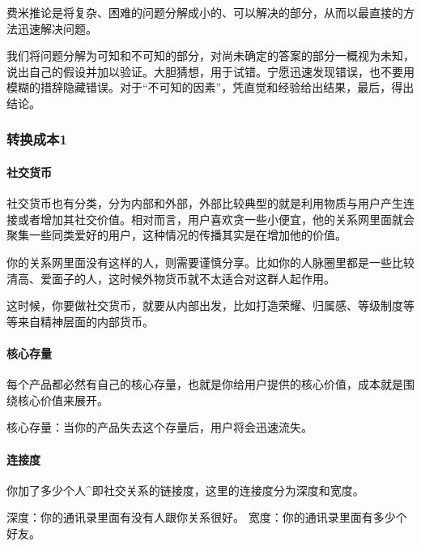 \documentclass[letterpaper,10pt,english]{sphinxmanual}
\begin{document}
费米推论是将复杂、困难的问题分解成小的、可以解决的部分，从而以最直接的方法迅速解决问题。

我们将问题分解为可知和不可知的部分，对尚未确定的答案的部分一概视为未知，说出自己的假设并加以验证。大胆猜想，用于试错。宁愿迅速发现错误，也不要用模糊的措辞隐藏错误。对于“不可知的因素”，凭直觉和经验给出结果，最后，得出结论。


\subsubsection{转换成本1\sphinxfootnotemark[395]}
\label{\detokenize{chapter_idea/convert:id1}}\label{\detokenize{chapter_idea/convert::doc}}%
\begin{footnotetext}[395]\sphinxAtStartFootnote
{}
%
\end{footnotetext}\ignorespaces 

\paragraph{社交货币}
\label{\detokenize{chapter_idea/convert:id2}}
社交货币也有分类，分为内部和外部，外部比较典型的就是利用物质与用户产生连接或者增加其社交价值。相对而言，用户喜欢贪一些小便宜，他的关系网里面就会聚集一些同类爱好的用户，这种情况的传播其实是在增加他的价值。

你的关系网里面没有这样的人，则需要谨慎分享。比如你的人脉圈里都是一些比较清高、爱面子的人，这时候外物货币就不太适合对这群人起作用。

这时候，你要做社交货币，就要从内部出发，比如打造荣耀、归属感、等级制度等等来自精神层面的内部货币。


\paragraph{核心存量}
\label{\detokenize{chapter_idea/convert:id3}}
每个产品都必然有自己的核心存量，也就是你给用户提供的核心价值，成本就是围绕核心价值来展开。

核心存量：当你的产品失去这个存量后，用户将会迅速流失。


\paragraph{连接度}
\label{\detokenize{chapter_idea/convert:id4}}
你加了多少个人\textasciicircum{}即社交关系的链接度，这里的连接度分为深度和宽度。

深度：你的通讯录里面有没有人跟你关系很好。
宽度：你的通讯录里面有多少个好友。
\end{document}
